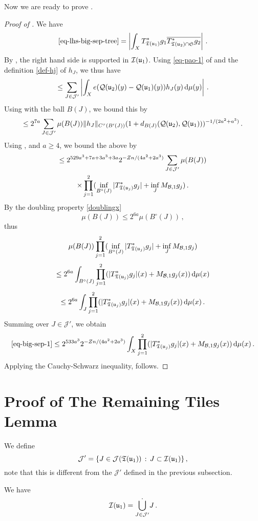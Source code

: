     Now we are ready to prove .
    \begin{proof}[Proof of ]
    \leanok
    We have
    $$
        \eqref{eq-lhs-big-sep-tree} = \left| \int_{X} T_{{\mathfrak T}({\mathfrak u}_1)}^* g_1 \overline{T_{{\mathfrak T}({\mathfrak u}_2) \cap \mathfrak{S}}^* g_2 }\right|\,.
    $$
    By , the right hand side is supported in ${\mathcal{I}}({\mathfrak u}_1)$. Using \eqref{eq-pao-1} of  and the definition \eqref{def-hj} of $h_J$, we thus have
    $$
        \le \sum_{J \in \mathcal{J}'} \left|\int_{X} e({\mathcal{Q}}({\mathfrak u}_2)(y) - {\mathcal{Q}}({\mathfrak u}_1)(y)) h_J(y) \, \mathrm{d}\mu(y) \right|\,.
    $$
    Using  with the ball $B(J)$, we bound this by
    $$
        \le 2^{7a} \sum_{J \in \mathcal{J}'} \mu(B(J)) \|h_J\|_{C^{\tau}(B'(J))} (1 + d_{B(J)}({\mathcal{Q}}({\mathfrak u}_2), {\mathcal{Q}}({\mathfrak u}_1)))^{-1/(2a^2+a^3)}\,.
    $$
    Using ,  and $a \ge 4$, we bound the above by
    \begin{multline}
        \label{eq-big-sep-1}
        \le 2^{529a^3+7a+3a^3+3a} 2^{-Zn/(4a^2 + 2a^3)} \sum_{J \in \mathcal{J}'} \mu(B(J)) \\
        \times \prod_{j=1}^2 (\inf_{B^\circ{}(J)} |T_{{\mathfrak T}({\mathfrak u}_j)}^* g_j| + \inf_J M_{\mathcal{B},1} g_j)\,.
    \end{multline}
    By the doubling property \eqref{doublingx}
    $$
        \mu(B(J)) \le 2^{6a} \mu(B^\circ{}(J))\,,
    $$
    thus
    $$
        \mu(B(J)) \prod_{j=1}^2 (\inf_{B^\circ{}(J)} |T_{{\mathfrak T}({\mathfrak u}_j)}^* g_j| + \inf_J M_{\mathcal{B},1} g_j)
    $$
    $$
        \le 2^{6a} \int_{B^\circ{}(J)} \prod_{j=1}^2 ( |T_{{\mathfrak T}({\mathfrak u}_j)}^* g_j|(x) + M_{\mathcal{B},1} g_j(x)) \, \mathrm{d}\mu(x)
    $$
    $$
        \le 2^{6a} \int_J \prod_{j=1}^2 ( |T_{{\mathfrak T}({\mathfrak u}_j)}^* g_j|(x) + M_{\mathcal{B},1} g_j(x)) \, \mathrm{d}\mu(x)\,.
    $$
    Summing over $J \in \mathcal{J}'$, we obtain
    $$
        \eqref{eq-big-sep-1} \le 2^{533a^3} 2^{-Zn/(4a^2 + 2a^3)} \int_X \prod_{j=1}^2 ( |T_{{\mathfrak T}({\mathfrak u}_j)}^* g_j|(x) + M_{\mathcal{B},1} g_j(x)) \, \mathrm{d}\mu(x)\,.
    $$
    Applying the Cauchy-Schwarz inequality,  follows.
    \end{proof}

\section{Proof of The Remaining Tiles Lemma}
    \label{subsec-rest-tiles}
    We define
    $$
        \mathcal{J}' = \{J \in \mathcal{J}({\mathfrak T}({\mathfrak u}_1)) \, : \, J \subset {\mathcal{I}}({\mathfrak u}_1)\}\,,
    $$
    note that this is different from the $\mathcal{J}'$ defined in the previous subsection.
    \begin{lemma}
        \label{dyadic-partition-2}
        \leanok
        We have
        $$
            {\mathcal{I}}({\mathfrak u}_1) = \dot{\bigcup_{J \in \mathcal{J}'}} J\,.
        $$
    \end{lemma}

